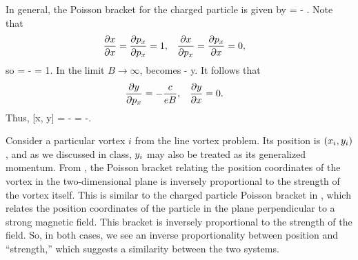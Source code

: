 \begin{solution}
	In general, the Poisson bracket for the charged particle is given by
	\beq
		[f, g] =   -  .
	\eeq
	Note that
	\begin{align*}
		\pdv{x}{x} &= \pdv{p_x}{p_x} = 1, &
		\pdv{x}{p_x} &= \pdv{p_x}{x} = 0,
	\end{align*}
	so
	\beq
		[x, \px] =  \pdv{\px}{\px} -   = 1.
	\eeq
	In the limit $B \to \infty$,  becomes
	\beq
		\px \to - y.
	\eeq
	It follows that
	\begin{align*}
		\pdv{y}{p_x} &= -\frac{c}{e B}, &
		\pdv{y}{x} &= 0.
	\end{align*}
	Thus,
	\beqn \label{poiss7b}
		[x, y] =   -   = -.
	\eeqn
	
	Consider a particular vortex $i$ from the line vortex problem.  Its position is $(x_i, y_i)$, and as we discussed in class, $y_i$ may also be treated as its generalized momentum.  From , the Poisson bracket relating the position coordinates of the vortex in the two-dimensional plane is inversely proportional to the strength of the vortex itself.  This is similar to the charged particle Poisson bracket in , which relates the position coordinates of the particle in the plane perpendicular to a strong magnetic field.  This bracket is inversely proportional to the strength of the field.  So, in both cases, we see an inverse proportionality between position and ``strength,'' which suggests a similarity between the two systems.
\end{solution}